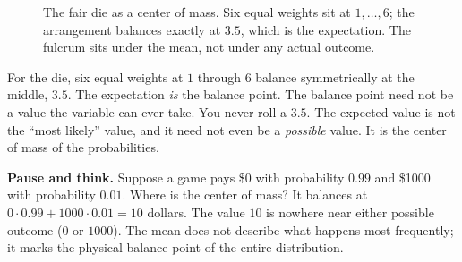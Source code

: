 \begin{figure}[H]
\centering
{}
\caption{The fair die as a center of mass. Six equal weights sit at
$1,\dots,6$; the arrangement balances exactly at $3.5$, which is the
expectation. The fulcrum sits under the mean, not under any actual outcome.}
\label{ch08:fig-die-balance}
\end{figure}

For the die, six equal weights at $1$ through $6$ balance symmetrically at the middle,
$3.5$. The expectation \emph{is} the balance point. The
balance point need not be a value the variable can ever take. You never roll a
$3.5$. The expected value is not the ``most likely'' value, and it need not even
be a \emph{possible} value. It is the center of mass of the probabilities.

\begin{recoverybox}
\textbf{Pause and think.} Suppose a game pays \$0 with probability $0.99$ and
\$1000 with probability $0.01$. Where is the center of mass? It balances at
$0\cdot 0.99 + 1000\cdot 0.01 = 10$ dollars. The value $10$ is nowhere near
either possible outcome ($0$ or $1000$). The mean does not describe what
happens most frequently; it marks the physical balance point of the entire
distribution.
\end{recoverybox}


